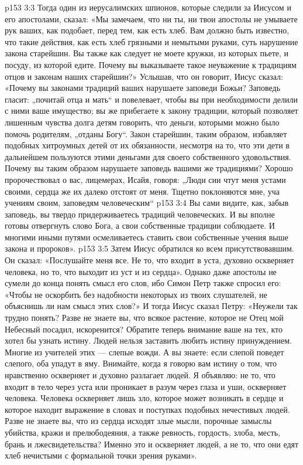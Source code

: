 \vs p153 3:3 Тогда один из иерусалимских шпионов, которые следили за Иисусом и его апостолами, сказал: «Мы замечаем, что ни ты, ни твои апостолы не умываете рук ваших, как подобает, перед тем, как есть хлеб. Вам должно быть известно, что такие действия, как есть хлеб грязными и немытыми руками, суть нарушение закона старейшин. Вы также как следует не моете кружки, из которых пьете, и посуду, из которой едите. Почему вы выказываете такое неуважение к традициям отцов и законам наших старейшин?» Услышав, что он говорит, Иисус сказал: «Почему вы законами традиций ваших нарушаете заповеди Божьи? Заповедь гласит: „почитай отца и мать“ и повелевает, чтобы вы при необходимости делили с ними ваше имущество; вы же прибегаете к закону традиции, который позволяет лишенным чувства долга детям говорить, что деньги, которыми можно было помочь родителям, „отданы Богу“. Закон старейшин, таким образом, избавляет подобных хитроумных детей от их обязанности, несмотря на то, что эти дети в дальнейшем пользуются этими деньгами для своего собственного удовольствия. Почему вы таким образом нарушаете заповедь вашими же традициями? Хорошо пророчествовал о вас, лицемерах, Исайя, говоря: „Люди сии чтут меня устами своими, сердца же их далеко отстоят от меня. Тщетно поклоняются мне, уча учениям своим, заповедям человеческим“
\vs p153 3:4 Вы сами видите, как, забыв заповедь, вы твердо придерживаетесь традиций человеческих. И вы вполне готовы отвергнуть слово Бога, а свои собственные традиции соблюдаете. И многими иными путями осмеливаетесь ставить свои собственные учения выше закона и пророков».
\vs p153 3:5 Затем Иисус обратился ко всем присутствовавшим. Он сказал: «Послушайте меня все. Не то, что входит в уста, духовно оскверняет человека, но то, что выходит из уст и из сердца». Однако даже апостолы не сумели до конца понять смысл его слов, ибо Симон Петр также спросил его: «Чтобы не оскорбить без надобности некоторых из твоих слушателей, не объяснишь ли нам смысл этих слов?» И тогда Иисус сказал Петру: «Неужели так трудно понять? Разве не знаете вы, что всякое растение, которое не Отец мой Небесный посадил, искоренится? Обратите теперь внимание ваше на тех, кто хотел бы узнать истину. Людей нельзя заставить любить истину принуждением. Многие из учителей этих --- слепые вожди. А вы знаете: если слепой поведет слепого, оба упадут в яму. Внимайте, когда я говорю вам истину о том, что нравственно оскверняет и духовно разлагает людей. Я объявляю: не то, что входит в тело через уста или проникает в разум через глаза и уши, оскверняет человека. Человека оскверняет лишь зло, которое может возникать в сердце и которое находит выражение в словах и поступках подобных нечестивых людей. Разве не знаете вы, что из сердца исходят злые мысли, порочные замыслы убийства, кражи и прелюбодеяния, а также ревность, гордость, злоба, месть, брань и лжесвидетельства? Именно это и оскверняет людей, а не то, что они едят хлеб нечистыми с формальной точки зрения руками».
